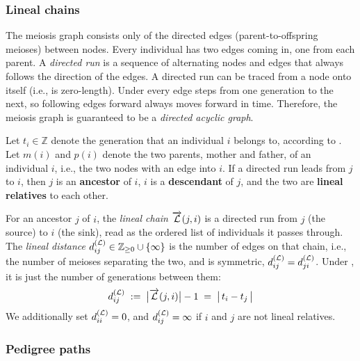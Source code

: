 \documentclass[12pt]{article}
\numberwithin{equation}{section}
\begin{document}
\subsubsection{Lineal chains}\label{sec:lineal-chains}
The meiosis graph consists only of the directed edges (parent-to-offspring meioses) between nodes.
Every individual has two edges coming in, one from each parent.
A \emph{directed run} is a sequence of alternating nodes and edges that always follows the direction of the edges.
A directed run can be traced from a node onto itself (i.e., is zero-length).
Under  every edge steps from one generation to the next, so following edges forward always moves forward in time.
Therefore, the meiosis graph is guaranteed to be a \emph{directed acyclic graph}.

Let $t_i \in \mathbb{Z}$ denote the generation that an individual $i$ belongs to, according to .
Let $m(i)$ and $p(i)$ denote the two parents, mother and father, of an individual $i$, i.e., the two nodes with an edge into $i$.
If a directed run leads from $j$ to $i$, then $j$ is an \textbf{ancestor} of $i$, $i$ is a \textbf{descendant} of $j$, and the two are \textbf{lineal relatives} to each other.

For an ancestor $j$ of $i$, the \emph{lineal chain} $\overrightarrow{\mathcal{L}}(j,i)$ is a directed run from $j$ (the source) to $i$ (the sink), read as the ordered list of individuals it passes through.
The \emph{lineal distance} $d^{(\mathcal{L})}_{ij} \in \mathbb{Z}_{\geq 0} \cup \{\infty\}$ is the number of edges on that chain, i.e., the number of meioses separating the two, and is symmetric, $d^{(\mathcal{L})}_{ij} = d^{(\mathcal{L})}_{ji}$.
Under , it is just the number of generations between them:
\begin{equation}\label{eq:lineal-dist}
    d^{(\mathcal{L})}_{ij} \;:=\; \big|\overrightarrow{\mathcal{L}}(j,i)\big| - 1 \;=\; \big|\, t_i - t_j \,\big|
\end{equation}
We additionally set $d^{(\mathcal{L})}_{ii} = 0$, and $d^{(\mathcal{L})}_{ij} = \infty$ if $i$ and $j$ are not lineal relatives.

\subsubsection{Pedigree paths}\label{sec:pedigree-paths}
\end{document}

